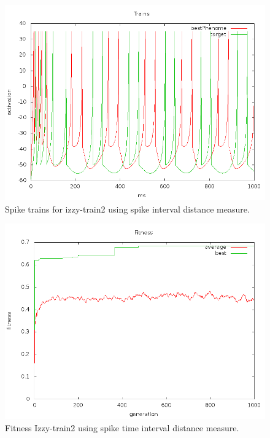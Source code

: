 \documentclass[a4paper]{article}
\begin{document}
\begin{figure}[htb!]
  \centering
  \includegraphics[width=\textwidth]{SpikeInterval-izzy2-trains-plot.png}
  \caption{Spike trains for izzy-train2 using spike interval distance measure.}
\end{figure}

\newpage

\begin{figure}[htb!]
  \centering
  \includegraphics[width=\textwidth]{Waveform-izzy2-fitness-plot.png}
  \caption{Fitness Izzy-train2 using spike time interval distance measure.}
\end{figure}
\end{document}
